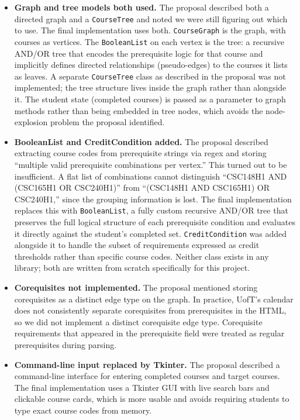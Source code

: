 \documentclass[11pt]{article}
\begin{document}
\begin{itemize}

    \item \textbf{Graph and tree models both used.} The proposal described both a directed
    graph and a \verb|CourseTree| and noted we were still figuring out which to use. The
    final implementation uses both. \verb|CourseGraph| is the graph, with courses as vertices.
    The \verb|BooleanList| on each vertex is the tree: a recursive AND/OR tree that encodes
    the prerequisite logic for that course and implicitly defines directed relationships
    (pseudo-edges) to the courses it lists as leaves. A separate \verb|CourseTree| class as
    described in the proposal was not implemented; the tree structure lives inside the
    graph rather than alongside it. The student state (completed courses) is passed as a
    parameter to graph methods rather than being embedded in tree nodes, which avoids the
    node-explosion problem the proposal identified.

    \item \textbf{BooleanList and CreditCondition added.} The proposal described extracting
    course codes from prerequisite strings via regex and storing ``multiple valid prerequisite
    combinations per vertex.'' This turned out to be insufficient. A flat list of combinations
    cannot distinguish ``CSC148H1 AND (CSC165H1 OR CSC240H1)'' from
    ``(CSC148H1 AND CSC165H1) OR CSC240H1,'' since the grouping information is lost. The
    final implementation replaces this with \verb|BooleanList|, a fully custom recursive
    AND/OR tree that preserves the full logical structure of each prerequisite condition and
    evaluates it directly against the student's completed set. \verb|CreditCondition| was
    added alongside it to handle the subset of requirements expressed as credit thresholds
    rather than specific course codes. Neither class exists in any library; both are written
    from scratch specifically for this project.

    \item \textbf{Corequisites not implemented.} The proposal mentioned storing corequisites
    as a distinct edge type on the graph. In practice, UofT's calendar does not consistently
    separate corequisites from prerequisites in the HTML, so we did not implement a distinct
    corequisite edge type. Corequisite requirements that appeared in the prerequisite field
    were treated as regular prerequisites during parsing.

    \item \textbf{Command-line input replaced by Tkinter.} The proposal described a
    command-line interface for entering completed courses and target courses. The final
    implementation uses a Tkinter GUI with live search bars and clickable course cards, which
    is more usable and avoids requiring students to type exact course codes from memory.


\end{itemize}
\end{document}

